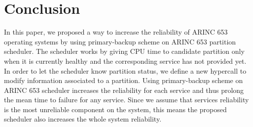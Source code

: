 \documentclass[conference]{IEEEtran}
\begin{document}




\section{Conclusion}

In this paper, we proposed a way to increase the reliability of ARINC 653 operating systems by
using primary-backup scheme on ARINC 653 partition scheduler. The scheduler works by giving CPU
time to candidate partition only when it is currently healthy and the corresponding service has
not provided yet. In order to let the scheduler know partition status, we define a new hypercall
to modify information associated to a partition. Using primary-backup scheme on ARINC 653
scheduler increases the reliability for each service and thus prolong the mean time to failure
for any service. Since we assume that services reliability is the most unreliable component on the
system, this means the proposed scheduler also increases the whole system reliability.
\end{document}
